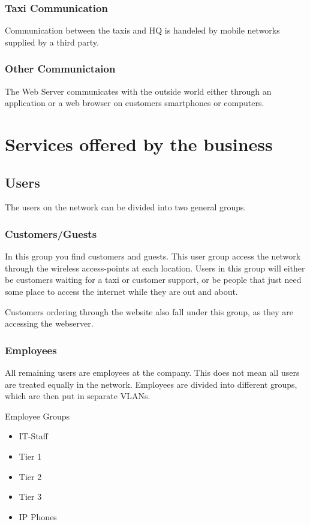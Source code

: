 \subsubsection{Taxi Communication}
Communication between the taxis and HQ is handeled by mobile networks supplied by a third party.

\subsubsection{Other Communictaion} %
The Web Server communicates with the outside world either through an application or a web browser on customers smartphones or computers.

\section{Services offered by the business}

\subsection{Users}
The users on the network can be divided into two general groups.

\subsubsection{Customers/Guests}
In this group you find customers and guests. 
This user group access the network through the wireless access-points at each location.
Users in this group will either be customers waiting for a taxi or customer support, or be people that just need some place to access the internet while they are out and about.

Customers ordering through the website also fall under this group, as they are accessing the webserver.

\subsubsection{Employees}
All remaining users are employees at the company.
This does not mean all users are treated equally in the network. 
Employees are divided into different groups, which are then put in separate VLANs.

Employee Groups
\begin{itemize}[noitemsep] 
    \item IT-Staff
    \item Tier 1
    \item Tier 2
    \item Tier 3
    \item IP Phones
\end{itemize}
\hfill

